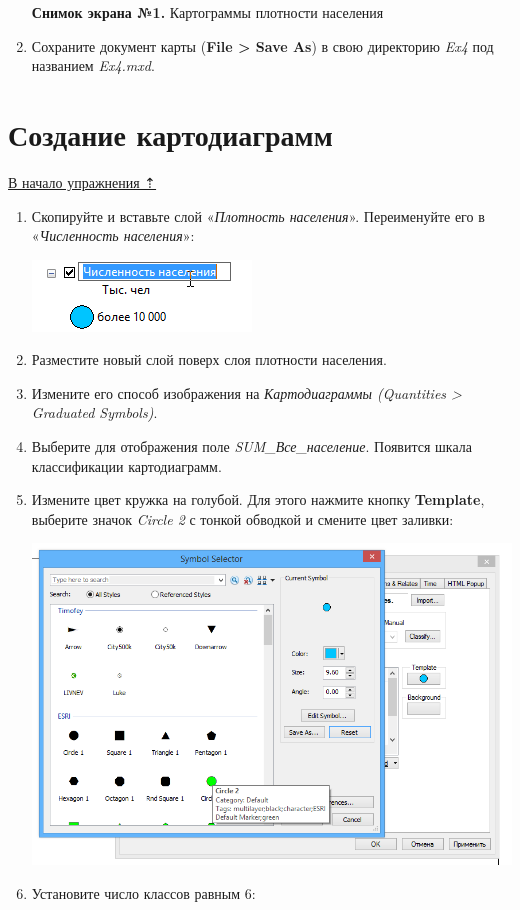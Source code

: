 \documentclass[12pt,]{book}
\begin{document}
\begin{enumerate}
  \textbf{Снимок экрана №1.} Картограммы плотности населения
\item
  Сохраните документ карты (\textbf{File \textgreater{} Save As}) в свою директорию \emph{Ex4} под названием \emph{Ex4.mxd}.
\end{enumerate}

\hypertarget{map-design-economic-diagrams}{%
\section{Создание картодиаграмм}\label{map-design-economic-diagrams}}

\protect\hyperlink{map-design-economic}{В начало упражнения ⇡}

\begin{enumerate}
\def\labelenumi{\arabic{enumi}.}
\setcounter{enumi}{1}
\item
  Скопируйте и вставьте слой «\emph{Плотность населения}». Переименуйте его в «\emph{Численность населения}»:

  \includegraphics{images/Ex04/image17.png}
\item
  Разместите новый слой поверх слоя плотности населения.
\item
  Измените его способ изображения на \emph{Картодиаграммы (Quantities \textgreater{} Graduated Symbols)}.
\item
  Выберите для отображения поле \emph{SUM\_Все\_население}. Появится шкала классификации картодиаграмм.
\item
  Измените цвет кружка на голубой. Для этого нажмите кнопку \textbf{Template}, выберите значок \emph{Circle 2} с тонкой обводкой и смените цвет заливки:

  \includegraphics{images/Ex04/image18.png}
\item
  Установите число классов равным 6:


\end{enumerate}
\end{document}
